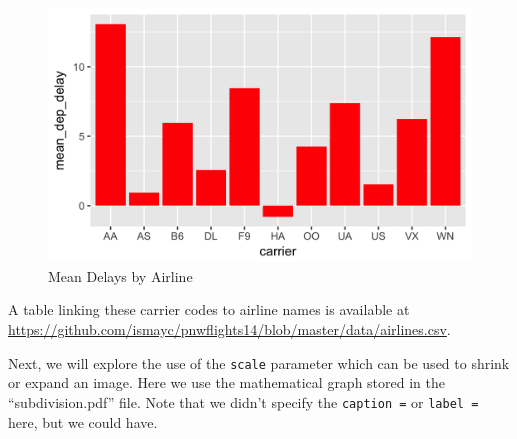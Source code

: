 \documentclass[12pt,twoside]{amherstthesis}
\begin{document}
  \begin{Shaded}
  \begin{Highlighting}[]
  \NormalTok{(} \NormalTok{, }
         \NormalTok{, }
         \NormalTok{, } \NormalTok{,}
         \NormalTok{)}
  \end{Highlighting}
  \end{Shaded}
  
  \begin{figure}[htbp]
  \centering
  \includegraphics[scale = 0.3,angle = 0]{figure/delays.png}
  \caption[Mean Delays by Airline]{\normalsize{Mean Delays by Airline}}
  \label{fig:delays}
  \end{figure}
  
  A table linking these carrier codes to airline names is available at
  \url{https://github.com/ismayc/pnwflights14/blob/master/data/airlines.csv}.
  
  \clearpage
  
  Next, we will explore the use of the \texttt{scale} parameter which can
  be used to shrink or expand an image. Here we use the mathematical graph
  stored in the ``subdivision.pdf'' file. Note that we didn't specify the
  \texttt{caption\ =} or \texttt{label\ =} here, but we could have.
  
  \begin{Shaded}
  \begin{Highlighting}[]
  \NormalTok{(}\NormalTok{, }\NormalTok{, }\NormalTok{, }
         \NormalTok{)}
  \end{Highlighting}
  \end{Shaded}
  
\end{document}

